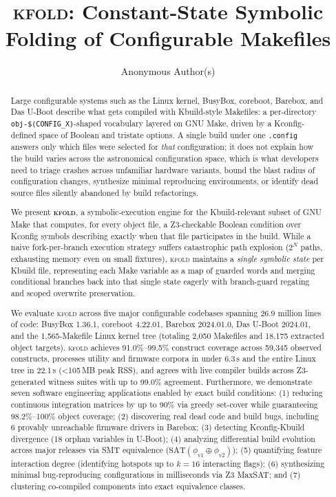 \documentclass[acmsmall,screen,review]{acmart}
\newcommand{\tool}{\textsc{kfold}\xspace}
\begin{document}
\title{\tool: Constant-State Symbolic Folding of Configurable Makefiles}

\author{Anonymous Author(s)}

\begin{abstract}
Large configurable systems such as the Linux kernel, BusyBox, coreboot, Barebox, and Das U-Boot describe what gets compiled with Kbuild-style Makefiles: a per-directory \texttt{obj-\$(CONFIG\_X)}-shaped vocabulary layered on GNU Make, driven by a Kconfig-defined space of Boolean and tristate options. A single build under one \texttt{.config} answers only which files were selected for \emph{that} configuration; it does not explain how the build varies across the astronomical configuration space, which is what developers need to triage crashes across unfamiliar hardware variants, bound the blast radius of configuration changes, synthesize minimal reproducing environments, or identify dead source files silently abandoned by build refactorings.

We present \textbf{\tool}, a symbolic-execution engine for the Kbuild-relevant subset of GNU Make that computes, for every object file, a Z3-checkable Boolean condition over Kconfig symbols describing exactly when that file participates in the build. While a naive fork-per-branch execution strategy suffers catastrophic path explosion ($2^N$ paths, exhausting memory even on small fixtures), \tool maintains a \emph{single symbolic state} per Kbuild file, representing each Make variable as a map of guarded words and merging conditional branches back into that single state eagerly with branch-guard regating and scoped overwrite preservation.

We evaluate \tool across five major configurable codebases spanning 26.9 million lines of code: BusyBox 1.36.1, coreboot 4.22.01, Barebox 2024.01.0, Das U-Boot 2024.01, and the 1,565-Makefile Linux kernel tree (totaling 2,050 Makefiles and 18,175 extracted object targets). \tool achieves 91.0\%--99.5\% construct coverage across 59,345 observed constructs, processes utility and firmware corpora in under 6.3\,s and the entire Linux tree in 22.1\,s (<105\,MB peak RSS), and agrees with live compiler builds across Z3-generated witness suites with up to 99.0\% agreement. Furthermore, we demonstrate seven software engineering applications enabled by exact build conditions: (1) reducing continuous integration matrices by up to 90\% via greedy set-cover while guaranteeing 98.2\%--100\% object coverage; (2) discovering real dead code and build bugs, including 6 provably unreachable firmware drivers in Barebox; (3) detecting Kconfig-Kbuild divergence (18 orphan variables in U-Boot); (4) analyzing differential build evolution across major releases via SMT equivalence ($\text{SAT}(\phi_{\text{v1}} \oplus \phi_{\text{v2}})$); (5) quantifying feature interaction degree (identifying hotspots up to $k=16$ interacting flags); (6) synthesizing minimal bug-reproducing configurations in milliseconds via Z3 MaxSAT; and (7) clustering co-compiled components into exact equivalence classes.
\end{abstract}
\end{document}
